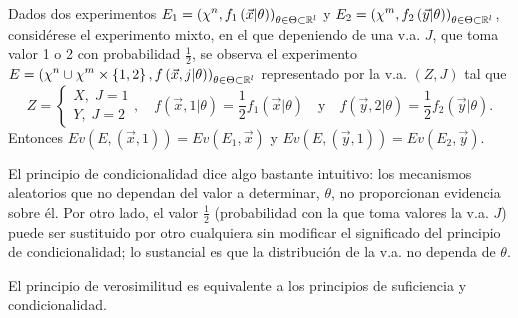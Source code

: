\begin{definition}
	Dados dos experimentos $\displaystyle E_{1}=\left(\chi^{n}, f_{1}\left(\vec{x}|\theta\right)\right)_{\theta\in\Theta\subset\mathbb{R}^{l}} $ y $\displaystyle E_{2}=\left(\chi^{m}, f_{2}\left(\vec{y}|\theta\right)\right)_{\theta\in\Theta\subset\mathbb{R}^{l}} $, considérese el experimento mixto, en el que depeniendo de una v.a. $\displaystyle J $, que toma valor 1 o 2 con probabilidad $\displaystyle \frac{1}{2} $, se observa el experimento $\displaystyle E = \left(\chi^{n} \cup \chi^{m} \times \left\{ 1,2\right\} , f\left(\vec{x}, j | \theta \right)\right)_{\theta\in\Theta\subset\mathbb{R}^{l}} $ representado por la v.a. $\displaystyle \left(Z,J\right) $ tal que 
	\[Z =
	\begin{cases}
	X, \; J = 1 \\
	Y, \; J = 2
	\end{cases}
	, \quad f\left(\vec{x}, 1|\theta \right)=\frac{1}{2}f_{1}\left(\vec{x} | \theta \right) \quad \text{y} \quad f\left(\vec{y}, 2 | \theta\right)=\frac{1}{2}f_{2}\left(\vec{y}|\theta \right).\]
Entonces $\displaystyle Ev\left(E, \left(\vec{x}, 1\right)\right) = Ev\left(E_{1}, \vec{x}\right) $ y $\displaystyle Ev\left(E, \left(\vec{y}, 1\right)\right)=Ev\left(E_{2}, \vec{y}\right) $. 
\end{definition}
\begin{observation}
El principio de condicionalidad dice algo bastante intuitivo: los mecanismos aleatorios que no dependan del valor a determinar, $\displaystyle \theta  $, no proporcionan evidencia sobre él. Por otro lado, el valor $\displaystyle \frac{1}{2} $ (probabilidad con la que toma valores la v.a. $\displaystyle J $) puede ser sustituido por otro cualquiera sin modificar el significado del principio de condicionalidad; lo sustancial es que la distribución de la v.a. no dependa de $\displaystyle \theta  $. 
\end{observation}
\begin{theorem}
El principio de verosimilitud es equivalente a los principios de suficiencia y condicionalidad. 
\end{theorem}
